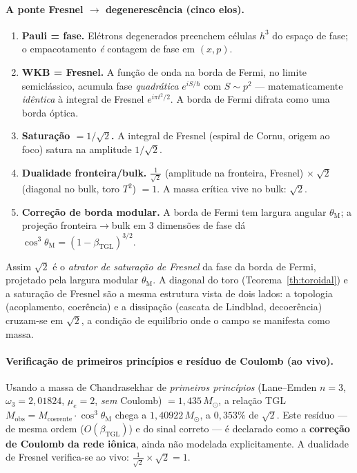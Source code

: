 \documentclass[12pt,a4paper]{article}
\newcommand{\betatgl}{\beta_{\text{TGL}}}
\newcommand{\thetaM}{\theta_{\text{M}}}
\newcommand{\TGL}{\textsc{TGL}}
\begin{document}
\paragraph{A ponte Fresnel $\to$ degenerescência (cinco elos).}
\begin{enumerate}[label=(\arabic*),leftmargin=2em]
\item \textbf{Pauli = fase.} Elétrons degenerados preenchem células $h^3$ do
espaço de fase; o empacotamento \emph{é} contagem de fase em $(x, p)$.
\item \textbf{WKB = Fresnel.} A função de onda na borda de Fermi, no limite
semiclássico, acumula fase \emph{quadrática} $e^{iS/\hbar}$ com $S \sim p^2$ ---
matematicamente \emph{idêntica} à integral de Fresnel $e^{i\pi t^2/2}$.  A borda
de Fermi difrata como uma borda óptica.
\item \textbf{Saturação $= 1/\sqrt{2}$.} A integral de Fresnel (espiral de Cornu,
origem ao foco) satura na amplitude $1/\sqrt{2}$.
\item \textbf{Dualidade fronteira/bulk.} $\tfrac{1}{\sqrt{2}}$ (amplitude na
fronteira, Fresnel) $\times\ \sqrt{2}$ (diagonal no bulk, toro $T^2$) $= 1$.  A
massa crítica vive no bulk: $\sqrt{2}$.
\item \textbf{Correção de borda modular.} A borda de Fermi tem largura angular
$\thetaM$; a projeção fronteira$\to$bulk em $3$ dimensões de fase dá
$\cos^3\thetaM = (1-\betatgl)^{3/2}$.
\end{enumerate}
Assim $\sqrt{2}$ é o \emph{atrator de saturação de Fresnel} da fase da borda de
Fermi, projetado pela largura modular $\thetaM$.  A diagonal do toro
(Teorema~\ref{th:toroidal}) e a saturação de Fresnel são a mesma estrutura vista
de dois lados: a topologia (acoplamento, coerência) e a dissipação (cascata de
Lindblad, decoerência) cruzam-se em $\sqrt{2}$, a condição de equilíbrio onde o
campo se manifesta como massa.

\paragraph{Verificação de primeiros princípios e resíduo de Coulomb (ao vivo).}
Usando a massa de Chandrasekhar de \emph{primeiros princípios} (Lane--Emden
$n=3$, $\omega_3 = 2{,}01824$, $\mu_e = 2$, \emph{sem} Coulomb)
$= 1{,}435\,M_\odot$, a
relação \TGL{} $M_{\text{obs}} = M_{\text{coerente}}\cdot\cos^3\thetaM$ chega a
$1{,}40922\,M_\odot$, a
$0{,}353\%$ de
$\sqrt{2}$.  Este resíduo --- de mesma ordem ($O(\betatgl)$) e do sinal correto
--- é declarado como a \textbf{correção de Coulomb da rede iônica}, ainda não
modelada explicitamente.  A dualidade de Fresnel verifica-se ao vivo:
$\tfrac{1}{\sqrt{2}} \times \sqrt{2} = 1$.
\end{document}
